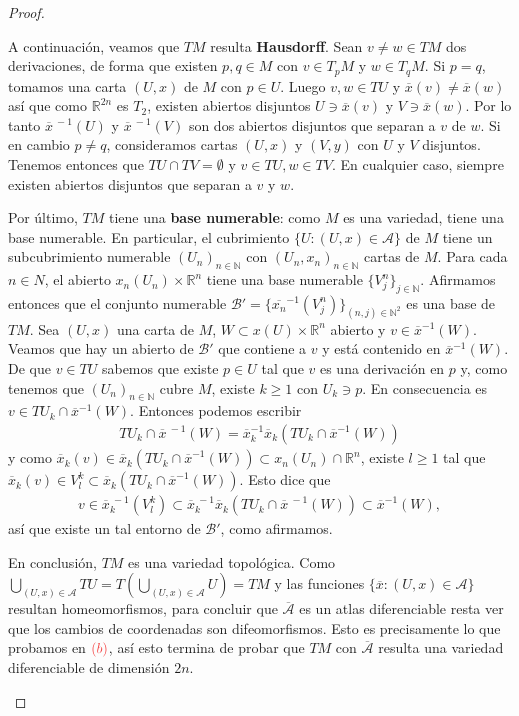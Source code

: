 \documentclass[11pt]{article}
\newcommand{\N}{\mathbb{N}}
\newcommand{\R}{\mathbb{R}}
\newcommand{\paint}[2]{\color{#1}{#2}}
\newcommand{\ol}{\overline}
\begin{document}
\begin{proof}
\begin{itemize}
A continuaci\'on, veamos que $TM$ resulta \textbf{Hausdorff}. Sean $v \neq w \in TM$ dos derivaciones, de forma que existen $p,q \in M$ con $v \in T_pM$ y $w \in T_qM$. Si $p = q$, tomamos una carta $(U,x)$ de $M$ con $p \in U$. Luego $v,w \in TU$ y $\ol{x}(v) \neq \ol{x}(w)$ as\'i que como $\R^{2n}$ es $T_2$, existen abiertos disjuntos $U \ni \ol{x}(v)$ y $V \ni \ol{x}(w)$. Por lo tanto $\ol{x}^{ \ -1}(U)$ y $\ol{x}^{\ -1}(V)$ son dos abiertos disjuntos que separan a $v$ de $w$. Si en cambio $p \neq q$, consideramos cartas $(U,x)$ y $(V,y)$ con $U$ y $V$ disjuntos. Tenemos entonces que $TU \cap TV = \emptyset$ y $v \in TU,w \in TV$. En cualquier caso, siempre existen abiertos disjuntos que separan a $v$ y $w$.

Por \'ultimo, $TM$ tiene una \textbf{base numerable}: como $M$ es una variedad, tiene una base numerable. En particular, el cubrimiento $\{U : (U,x) \in \mathcal{A}\}$ de $M$ tiene un subcubrimiento numerable $(U_n)_{n \in \N}$ con ${(U_n,x_n)}_{n \in \N}$ cartas de $M$. Para cada $n \in N$, el abierto $x_n(U_n) \times \R^n$ tiene una base numerable $\{V^n_j\}_{j \in \N}$. Afirmamos entonces que el conjunto numerable $\mathcal{B}' = \{\ol{x_n}^{-1}(V^n_j)\}_{(n,j) \in \N^2}$ es una base de $TM$. Sea $(U,x)$ una carta de $M$, $W \subset x(U) \times \R^n$ abierto y $v \in \ol{x}^{-1}(W)$. Veamos que hay un abierto de $\mathcal{B}'$ que contiene a $v$ y est\'a contenido en $\ol{x}^{-1}(W)$. De que $v \in TU$ sabemos que existe $p \in U$ tal que $v$ es una derivaci\'on en $p$ y, como tenemos que $(U_n)_{n \in \N}$ cubre $M$, existe $k \geq 1$ con $U_k \ni p$. En consecuencia es $v \in TU_k \cap \ol{x}^{-1}(W)$. Entonces podemos escribir
\begin{align*}
TU_k \cap \ol{x}^{\ -1}(W) = \ol{x}^{-1}_k\ol{x}_k(TU_k \cap \ol{x}^{-1}(W))
\end{align*}
y como $\ol{x}_k(v) \in \ol{x}_k(TU_k \cap \ol{x}^{-1}(W)) \subset x_n(U_n) \cap \R^n$, existe $l \geq 1$ tal que $\ol{x}_k(v) \in V_l^k \subset \ol{x}_k(TU_k \cap \ol{x}^{-1}(W))$. Esto dice que
\begin{align*}
v \in \ol{x}_k^{\ -1}(V_l^k) \subset \ol{x}^{\ -1}_k\ol{x}_k(TU_k \cap \ol{x}^{\ -1}(W)) \subset \ol{x}^{-1}(W),
\end{align*}
as\'i que existe un tal entorno de $\mathcal{B}'$, como afirmamos.

En conclusi\'on, $TM$ es una variedad topol\'ogica. Como $\bigcup_{(U,x) \in \mathcal{A}}TU = T (\bigcup_{(U,x) \in \mathcal{A}}U) = TM$ y las funciones $\{\ol{x} : (U,x) \in \mathcal{A}\}$ resultan homeomorfismos, para concluir que $\ol{\mathcal{A}}$ es un atlas diferenciable resta ver que los cambios de coordenadas son difeomorfismos. Esto es precisamente lo que probamos en $\paint{red}{(b)}$, as\'i esto termina de probar que $TM$ con $\ol{\mathcal{A}}$ resulta una variedad diferenciable de dimensi\'on $2n$.


\end{itemize}
\end{proof}
\end{document}
